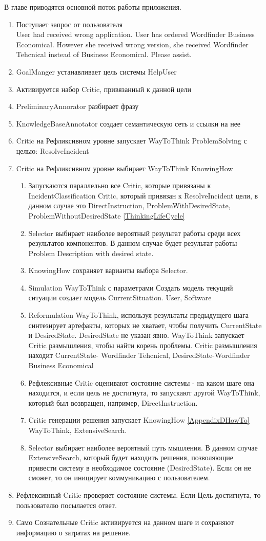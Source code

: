 В главе приводятся основной поток работы приложения.
 \begin{enumerate}
	\item Поступает запрос от пользователя \\
	User had received wrong application.
User has ordered Wordfinder Business Economical.
However she received wrong version, she received Wordfinder Tehcnical instead of Business Economical. Please assist.
	\item GoalManger устанавливает цель системы HelpUser
	\item Активируется набор Critic, привязанный к данной цели
	\item PreliminaryAnnorator разбирает фразу
	\item KnowledgeBaseAnnotator создает семантическую сеть и ссылки на нее
	\item Critic на Рефликсивном уровне запускает WayToThink ProblemSolving с целью: ResolveIncident
	\item Critic на Рефликсивном уровне выбирает WayToThink KnowingHow
	\begin{enumerate}
	\item Запускаются параллельно все Critic, которые привязаны к IncidentClassification Critic, который привязан к ResolveIncident цели, в данном случае это DirectInstruction, ProblemWithDesiredState, ProblemWithoutDesiredState \ref{ThinkingLifeCycle}
	\item Selector выбирает наиболее вероятный результат работы среди всех результатов компонентов. В данном случае будет результат работы Problem Description with desired state.
	\item KnowingHow сохраняет варианты выбора Selector.
	\item Simulation WayToThink с параметрами Создать модель текущий ситуации создает модель CurrentSituation. User, Software
	\item Reformulation WayToThink, используя результаты предыдущего шага синтезирует артефакты, которых не хватает, чтобы получить CurrentState и DesiredState. DesiredState не указан явно. WayToThink запускает Critic размышления, чтобы найти корень проблемы. Critic размышления находит CurrentState- Wordfinder Tehcnical, DesiredState-Wordfinder Business Economical
	\item Рефлексивные Critic оценивают состояние системы - на каком шаге она находится, и если цель не достигнута, то запускают другой WayToThink, который был возвращен, например, DirectInstruction. 
	\item Critic генерации решения запускает KnowingHow \ref{AppendixDHowTo} WayToThink, ExtensiveSearch.
	\item Selector выбирает наиболее вероятный путь мышления. В данном случае ExtensiveSearch, который будет находить решения, позволяющие привести систему в необходимое состояние (DesiredState). Если он не сможет, то он иницирует коммуникацию с пользователем. 
 \end{enumerate}
	 \item Рефлексивный Critic проверяет состояние системы. Если Цель достигнута, то пользователю посылается ответ.
	 \item Само Сознательные Critic активируется на данном шаге и сохраняют информацию о затратах на решение.


\end{enumerate}
